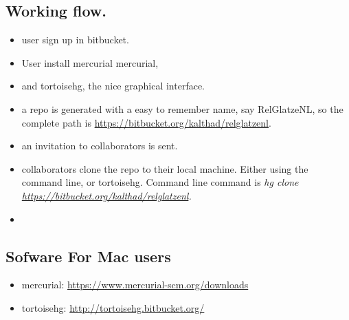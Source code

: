\documentclass[11pt]{article}
\begin{document}
\subsection{Working flow.}
\label{sec:orgheadline12}

\begin{itemize}
\item user sign up in bitbucket.
\item User install mercurial mercurial,
\item and tortoisehg, the nice graphical interface.
\item a repo is generated with a easy to remember name, say
RelGlatzeNL, so the complete path is \url{https://bitbucket.org/kalthad/relglatzenl}.
\item an invitation to collaborators is sent.
\item collaborators clone the repo to their local machine. Either
using the command line, or tortoisehg. Command line command
is \emph{hg clone \url{https://bitbucket.org/kalthad/relglatzenl}.}
\item 
\end{itemize}



\subsection{Sofware For Mac users}
\label{sec:orgheadline13}
\begin{itemize}
\item mercurial:   \url{https://www.mercurial-scm.org/downloads}
\item tortoisehg: \url{http://tortoisehg.bitbucket.org/}
\end{itemize}
\end{document}
